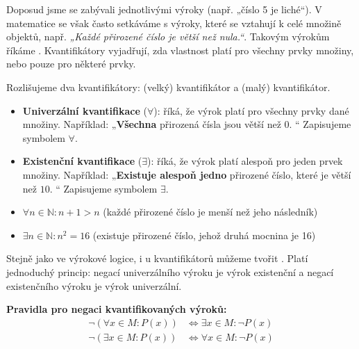 \documentclass[12pt,a4paper]{article}
\begin{document}
Doposud jsme se zabývali jednotlivými výroky (např. „číslo 5 je liché“).  
V matematice se však často setkáváme s výroky, které se vztahují k celé množině objektů, např. \emph{„Každé přirozené číslo je větší než nula.“}.  
Takovým výrokům říkáme .  
Kvantifikátory vyjadřují, zda vlastnost platí pro všechny prvky množiny, nebo pouze pro některé prvky.  

Rozlišujeme dva kvantifikátory:  
 (velký) kvantifikátor a  (malý) kvantifikátor.

\begin{definitionbox}
\begin{itemize}
    \item \textbf{Univerzální kvantifikace} ($\forall$): říká, že výrok platí pro všechny prvky dané množiny.  
    Například: „\textbf{Všechna} přirozená čísla jsou větší než $0$. “  
    Zapisujeme symbolem $\forall$.
    \item \textbf{Existenční kvantifikace} ($\exists$): říká, že výrok platí alespoň pro jeden prvek množiny.  
    Například: „\textbf{Existuje alespoň jedno} přirozené číslo, které je větší než $10$. “  
    Zapisujeme symbolem $\exists$.
\end{itemize}
\end{definitionbox}

\begin{examplebox}
\begin{itemize}
    \item $\forall n \in \mathbb{N}: n+1 > n$ \hfill (každé přirozené číslo je menší než jeho následník)  
    \item $\exists n \in \mathbb{N}: n^2 = 16$ \hfill (existuje přirozené číslo, jehož druhá mocnina je 16)
\end{itemize}
\end{examplebox}

Stejně jako ve výrokové logice, i u kvantifikátorů můžeme tvořit .  
Platí jednoduchý princip: negací univerzálního výroku je výrok existenční a negací existenčního výroku je výrok univerzální.

\begin{notebox}
\textbf{Pravidla pro negaci kvantifikovaných výroků:}
\begin{align*}
\neg(\forall x \in M: P(x)) &\Leftrightarrow \exists x \in M: \neg P(x) \\
\neg(\exists x \in M: P(x)) &\Leftrightarrow \forall x \in M: \neg P(x)
\end{align*}
\end{notebox}
\end{document}
